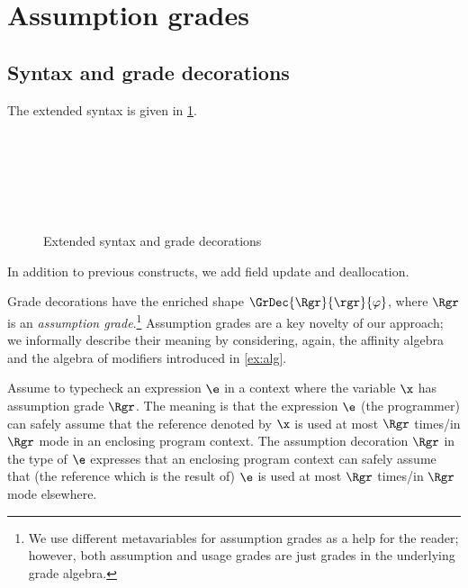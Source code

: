 \section{Assumption grades}

\subsection{Syntax and grade decorations} 
 The extended syntax is given in \cref{fig:ext-syntax}. 
\begin{figure}
\begin{grammatica}
\\
\\
\\
\\
\
\end{grammatica}
\caption{Extended syntax and grade decorations}\label{fig:ext-syntax}
\end{figure}
In addition to previous constructs, we add field update and deallocation. 

Grade decorations have the enriched shape $\GrDec{\Rgr}{\rgr}{\varphi}$, where $\Rgr$ is an \emph{assumption grade}.\footnote{We use different metavariables for assumption grades as a help for the reader; however, both assumption and usage grades are just grades in the underlying grade algebra.}
Assumption grades are a key novelty of our approach; we informally describe their meaning  by considering, again, the affinity algebra and the algebra of modifiers introduced in \cref{ex:alg}. 

Assume to typecheck an expression $\e$ in a context where the variable $\x$ has assumption grade $\Rgr$. The meaning is that the expression $\e$ (the programmer) can safely assume that the reference denoted by $\x$ is used at most $\Rgr$ times/in $\Rgr$ mode  in an enclosing program context. The assumption decoration $\Rgr$ in the type of $\e$ expresses that an enclosing program context can safely assume that (the reference which is the result of) $\e$  is used at most $\Rgr$ times/in $\Rgr$ mode elsewhere. 

